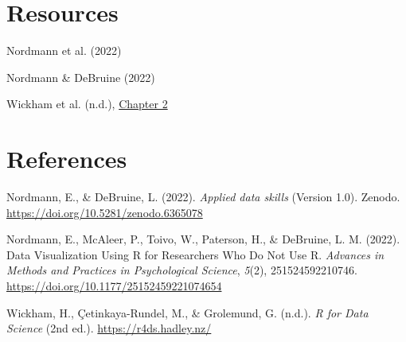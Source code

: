 \documentclass[
  letterpaper,
  DIV=11,
  numbers=noendperiod]{scrartcl}
\newlength{\cslhangindent}
\newlength{\cslentryspacingunit} %
\newenvironment{CSLReferences}[2] %
 {%
  \setlength{\parindent}{0pt}
  \ifodd #1
  \let\oldpar\par
  \def\par{\hangindent=\cslhangindent\oldpar}
  \fi
  \setlength{\parskip}{#2\cslentryspacingunit}
 }%
 {}
\begin{document}
\hypertarget{resources}{%
\section{Resources}\label{resources}}

Nordmann et al. (2022)

Nordmann \& DeBruine (2022)

Wickham et al. (n.d.),
\href{https://r4ds.hadley.nz/data-visualize.html}{Chapter 2}

\hypertarget{references}{%
\section*{References}\label{references}}

\hypertarget{refs}{}
\begin{CSLReferences}{1}{0}
\leavevmode{}%
Nordmann, E., \& DeBruine, L. (2022). \emph{Applied data skills}
(Version 1.0). Zenodo. \url{https://doi.org/10.5281/zenodo.6365078}

\leavevmode{}%
Nordmann, E., McAleer, P., Toivo, W., Paterson, H., \& DeBruine, L. M.
(2022). Data Visualization Using R for Researchers Who Do Not Use R.
\emph{Advances in Methods and Practices in Psychological Science},
\emph{5}(2), 251524592210746.
\url{https://doi.org/10.1177/25152459221074654}

\leavevmode{}%
Wickham, H., Çetinkaya-Rundel, M., \& Grolemund, G. (n.d.). \emph{R for
Data Science} (2nd ed.). \url{https://r4ds.hadley.nz/}

\end{CSLReferences}
\end{document}
